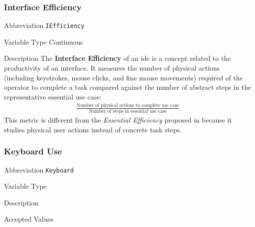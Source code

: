\subsubsection{Interface Efficiency}
\label{subsec:iefficiency}

\begin{AlignedDesc}
  \item[Abbreviation] \texttt{IEfficiency}

  \item[Variable Type] Continuous

  \item[Description] The \textbf{Interface Efficiency} of an \ac{ide} is a
  concept related to the productivity of an interface. It measures the
  number of physical actions (including keystrokes, mouse clicks, and fine
  mouse movements) required of the operator to complete a task compared
  against the number of abstract steps in the representative essential use
  case:
%
  \begin{align*}
    \frac{\text{Number of physical actions to complete use case}}
         {\text{Number of steps in essential use case}}
  \end{align*}
%
  This metric is different from the \textit{Essential Efficiency} proposed
  in \cite{constantine1996} because it studies physical user actions
  instead of concrete task steps.

\end{AlignedDesc}

\subsubsection{Keyboard Use}
\label{subsec:keyboard}

\begin{AlignedDesc}
  \item[Abbreviation] \texttt{Keyboard}

  \item[Variable Type]

  \item[Description]

  \item[Accepted Values]

  \begin{AlignedDesc}
    \item[\textellipsis]
  \end{AlignedDesc}

\end{AlignedDesc}

